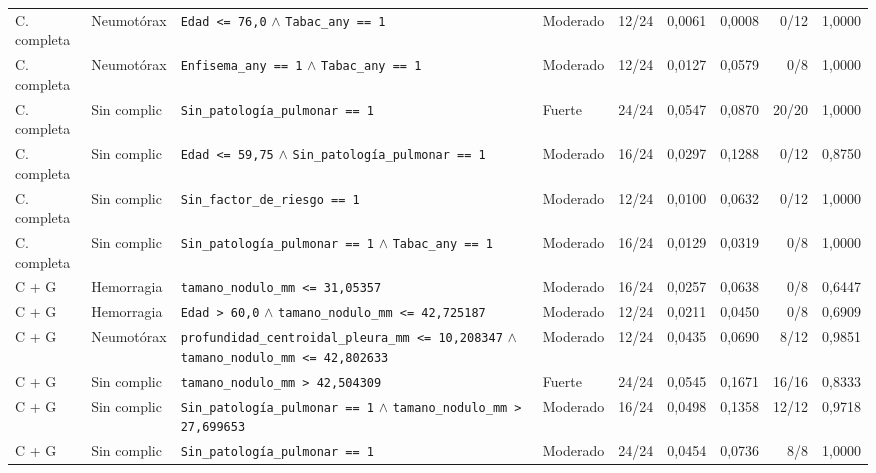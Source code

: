 \begin{landscape}
\begin{longtable}{p{2.1cm}p{1.5cm}p{6.0cm}p{1.5cm}rrrrr}
C. completa & Neumotórax & \texttt{Edad <= 76,0} \(\land\) \texttt{Tabac\_any == 1} & Moderado & 12/24 & 0,0061 & 0,0008 & 0/12 & 1,0000 \\

C. completa & Neumotórax & \texttt{Enfisema\_any == 1} \(\land\) \texttt{Tabac\_any == 1} & Moderado & 12/24 & 0,0127 & 0,0579 & 0/8 & 1,0000 \\

C. completa & Sin complic & \texttt{Sin\_patología\_pulmonar == 1} & Fuerte & 24/24 & 0,0547 & 0,0870 & 20/20 & 1,0000 \\

C. completa & Sin complic & \texttt{Edad <= 59,75} \(\land\) \texttt{Sin\_patología\_pulmonar == 1} & Moderado & 16/24 & 0,0297 & 0,1288 & 0/12 & 0,8750 \\

C. completa & Sin complic & \texttt{Sin\_factor\_de\_riesgo == 1} & Moderado & 12/24 & 0,0100 & 0,0632 & 0/12 & 1,0000 \\

C. completa & Sin complic & \texttt{Sin\_patología\_pulmonar == 1} \(\land\) \texttt{Tabac\_any == 1} & Moderado & 16/24 & 0,0129 & 0,0319 & 0/8 & 1,0000 \\

C + G & Hemorragia & \texttt{tamano\_nodulo\_mm <= 31,05357} & Moderado & 16/24 & 0,0257 & 0,0638 & 0/8 & 0,6447 \\

C + G & Hemorragia & \texttt{Edad > 60,0} \(\land\) \texttt{tamano\_nodulo\_mm <= 42,725187} & Moderado & 12/24 & 0,0211 & 0,0450 & 0/8 & 0,6909 \\

C + G & Neumotórax & \texttt{profundidad\_centroidal\_pleura\_mm <= 10,208347} \(\land\) \texttt{tamano\_nodulo\_mm <= 42,802633} & Moderado & 12/24 & 0,0435 & 0,0690 & 8/12 & 0,9851 \\

C + G & Sin complic & \texttt{tamano\_nodulo\_mm > 42,504309} & Fuerte & 24/24 & 0,0545 & 0,1671 & 16/16 & 0,8333 \\

C + G & Sin complic & \texttt{Sin\_patología\_pulmonar == 1} \(\land\) \texttt{tamano\_nodulo\_mm > 27,699653} & Moderado & 16/24 & 0,0498 & 0,1358 & 12/12 & 0,9718 \\

C + G & Sin complic & \texttt{Sin\_patología\_pulmonar == 1} & Moderado & 24/24 & 0,0454 & 0,0736 & 8/8 & 1,0000 \\


\end{longtable}
\end{landscape}
